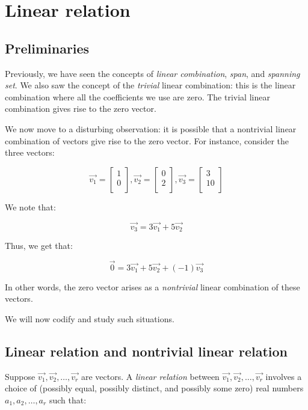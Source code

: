 \documentclass[10pt]{amsart}
\begin{document}
\section{Linear relation}

\subsection{Preliminaries}

Previously, we have seen the concepts of {\em linear combination},
{\em span}, and {\em spanning set}. We also saw the concept of the
{\em trivial} linear combination: this is the linear combination where
all the coefficients we use are zero. The trivial linear combination
gives rise to the zero vector.

We now move to a disturbing observation: it is possible that a
nontrivial linear combination of vectors give rise to the zero
vector. For instance, consider the three vectors:

$$\vec{v_1} = \left[ \begin{matrix} 1 \\ 0 \\\end{matrix}\right], \vec{v_2} = \left[ \begin{matrix} 0 \\ 2 \\\end{matrix}\right], \vec{v_3} = \left[ \begin{matrix} 3 \\ 10 \\\end{matrix}\right]$$

We note that:

$$\vec{v_3} = 3\vec{v_1} + 5\vec{v_2}$$

Thus, we get that:

$$\vec{0} = 3\vec{v_1} + 5\vec{v_2} + (-1)\vec{v_3}$$

In other words, the zero vector arises as a {\em nontrivial} linear
combination of these vectors.

We will now codify and study such situations.

\subsection{Linear relation and nontrivial linear relation}

Suppose $\vec{v_1},\vec{v_2},\dots,\vec{v_r}$ are vectors. A {\em
  linear relation} between $\vec{v_1},\vec{v_2},\dots,\vec{v_r}$
involves a choice of (possibly equal, possibly distinct, and possibly
some zero) real numbers $a_1,a_2,\dots,a_r$ such that:
\end{document}
